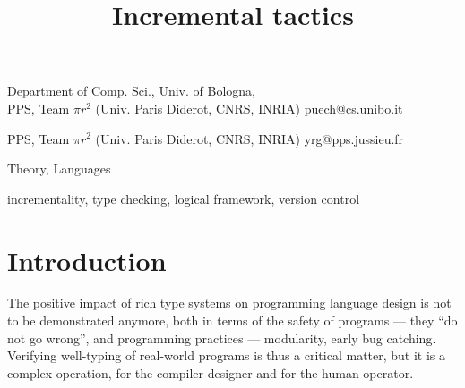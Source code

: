 \documentclass[9pt]{sigplanconf}
\begin{document}
\copyrightdata{[to be supplied]}


\title{Incremental tactics}

           {Department of Comp. Sci., Univ. of Bologna,\\
             PPS, Team $\pi r^2$ (Univ. Paris Diderot, CNRS, INRIA)}
           {puech@cs.unibo.it}

           {PPS, Team $\pi r^2$ (Univ. Paris Diderot, CNRS, INRIA)}
           {yrg@pps.jussieu.fr}

\maketitle

\begin{abstract}
\end{abstract}

 

\terms
Theory, Languages

\keywords
incrementality, type checking, logical framework, version control


\section*{Introduction}


The positive impact of rich type systems on programming language
design is not to be demonstrated anymore, both in terms of the safety
of programs --- they ``do not go wrong'', and programming practices
--- modularity, early bug catching. Verifying well-typing of
real-world programs is thus a critical matter, but it is a complex
operation, for the compiler designer and for the human operator.
\end{document}

